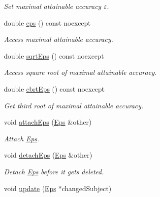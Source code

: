 \begin{DoxyCompactItemize}
\begin{DoxyCompactList}\small\item\em Set maximal attainable accuracy $\varepsilon$. \end{DoxyCompactList}\item 
double \hyperlink{classSpacy_1_1Mixin_1_1Eps_a40e2ba8f3abd2b5370ef41238cfaaf8b_a40e2ba8f3abd2b5370ef41238cfaaf8b}{eps} () const noexcept
\begin{DoxyCompactList}\small\item\em Access maximal attainable accuracy. \end{DoxyCompactList}\item 
double \hyperlink{classSpacy_1_1Mixin_1_1Eps_a29e8c25dc3f1fdede57b8eb06f520fe1_a29e8c25dc3f1fdede57b8eb06f520fe1}{sqrt\+Eps} () const noexcept
\begin{DoxyCompactList}\small\item\em Access square root of maximal attainable accuracy. \end{DoxyCompactList}\item 
double \hyperlink{classSpacy_1_1Mixin_1_1Eps_a1879ebbf1b467cb4be36bcc63307018d_a1879ebbf1b467cb4be36bcc63307018d}{cbrt\+Eps} () const noexcept
\begin{DoxyCompactList}\small\item\em Get third root of maximal attainable accuracy. \end{DoxyCompactList}\item 
void \hyperlink{classSpacy_1_1Mixin_1_1Eps_af69cd3dee52e723302b21ca2a25f1192_af69cd3dee52e723302b21ca2a25f1192}{attach\+Eps} (\hyperlink{classSpacy_1_1Mixin_1_1Eps_a51dbe0b9cc950e0f3dfd34a481f08ae4_a51dbe0b9cc950e0f3dfd34a481f08ae4}{Eps} \&other)
\begin{DoxyCompactList}\small\item\em Attach \hyperlink{classSpacy_1_1Mixin_1_1Eps}{Eps}. \end{DoxyCompactList}\item 
\hypertarget{classSpacy_1_1Mixin_1_1Eps_ab49910e189cb86b6fd6f89b6f2af14cc}{}void \hyperlink{classSpacy_1_1Mixin_1_1Eps_ab49910e189cb86b6fd6f89b6f2af14cc}{detach\+Eps} (\hyperlink{classSpacy_1_1Mixin_1_1Eps_a51dbe0b9cc950e0f3dfd34a481f08ae4_a51dbe0b9cc950e0f3dfd34a481f08ae4}{Eps} \&other)\label{classSpacy_1_1Mixin_1_1Eps_ab49910e189cb86b6fd6f89b6f2af14cc}

\begin{DoxyCompactList}\small\item\em Detach \hyperlink{classSpacy_1_1Mixin_1_1Eps}{Eps} before it gets deleted. \end{DoxyCompactList}\item 
\hypertarget{classSpacy_1_1Mixin_1_1Eps_a151216968daef3da5f5cdc0b957ce01b}{}void \hyperlink{classSpacy_1_1Mixin_1_1Eps_a151216968daef3da5f5cdc0b957ce01b}{update} (\hyperlink{classSpacy_1_1Mixin_1_1Eps_a51dbe0b9cc950e0f3dfd34a481f08ae4_a51dbe0b9cc950e0f3dfd34a481f08ae4}{Eps} $\ast$changed\+Subject)\label{classSpacy_1_1Mixin_1_1Eps_a151216968daef3da5f5cdc0b957ce01b}


\end{DoxyCompactItemize}
